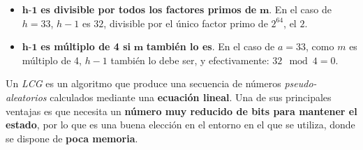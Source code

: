\begin{itemize}
	\item $\textbf{h-1}$ \textbf{es divisible por todos los factores primos de} $\textbf{m}$.
En el caso de $h=33$, $h-1$ es $32$, divisible por el único factor primo de $2^{64}$, el $2$.

	\item $\textbf{h-1}$ \textbf{es múltiplo de 4 si} $\textbf{m}$ \textbf{también lo es}.
En el caso de $a=33$, como $m$ es múltiplo de 4, $h-1$ también lo debe ser, y efectivamente: $32 \! \mod 4 = 0$.
\end{itemize}

Un \emph{LCG} es un algoritmo que produce una secuencia de números \emph{pseudo-aleatorios} calculados mediante una
\textbf{ecuación lineal}. Una de sus principales ventajas es que necesita un \textbf{número muy reducido de bits para mantener el
estado}, por lo que es una buena elección en el entorno en el que se utiliza, donde se dispone de \textbf{poca memoria}.

